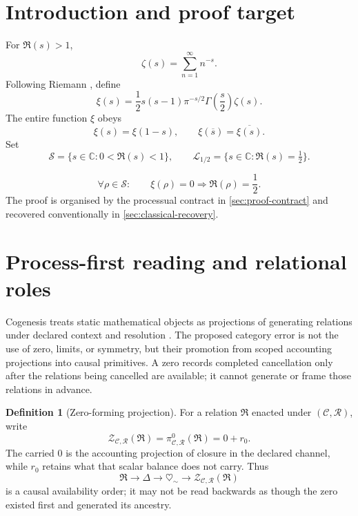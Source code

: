\documentclass[11pt,a4paper]{article}
\theoremstyle{definition}
\newtheorem{definition}[theorem]{Definition}
\newcommand{\C}{\mathbb{C}}
\newcommand{\heartsim}{\heartsuit_{\sim}}
\newcommand{\Cctx}{\mathcal{C}}
\newcommand{\Rres}{\mathcal{R}}
\newcommand{\CriticalLine}{\mathcal{L}_{1/2}}
\newcommand{\CriticalStrip}{\mathcal{S}}
\begin{document}
\newpage
\section{Introduction and proof target}
\label{sec:introduction}

For $\Re(s)>1$,
\begin{equation}
\label{eq:zeta-dirichlet-series}
  \zeta(s)=\sum_{n=1}^{\infty}n^{-s}.
\end{equation}
Following Riemann \parencite{riemann1859}, define
\begin{equation}
\label{eq:completed-xi}
  \xi(s)=\frac12s(s-1)\pi^{-s/2}
    \Gamma\!\left(\frac{s}{2}\right)\zeta(s).
\end{equation}
The entire function $\xi$ obeys
\begin{equation}
\label{eq:xi-static-symmetries}
  \xi(s)=\xi(1-s),
  \qquad
  \xi(\overline{s})=\overline{\xi(s)}.
\end{equation}
Set
\[
  \CriticalStrip=\{s\in\C:0<\Re(s)<1\},
  \qquad
  \CriticalLine=\{s\in\C:\Re(s)=\tfrac12\}.
\]

\begin{keybox}[title={\bfseries Riemann theorem}]
\begin{equation}
\label{eq:riemann-target}
  \forall\rho\in\CriticalStrip:
  \qquad
  \xi(\rho)=0\Longrightarrow\Re(\rho)=\frac12.
\end{equation}
The proof is organised by the processual contract in
\cref{sec:proof-contract} and recovered conventionally in
\cref{sec:classical-recovery}.
\end{keybox}

\section{Process-first reading and relational roles}
\label{sec:process-first}

Cogenesis treats static mathematical objects as projections of generating
relations under declared context and resolution
\parencite{petrik2026cogenesis,petrik2026concise}. The proposed category error
is not the use of zero, limits, or symmetry, but their promotion from scoped
accounting projections into causal primitives. A zero records completed
cancellation only after the relations being cancelled are available; it cannot
generate or frame those relations in advance.

\begin{definition}[Zero-forming projection]
For a relation $\mathfrak R$ enacted under $(\Cctx,\Rres)$, write
\[
  \mathcal Z_{\Cctx,\Rres}(\mathfrak R)
  =
  \pi^0_{\Cctx,\Rres}(\mathfrak R)
  =
  0+r_0.
\]
The carried $0$ is the accounting projection of closure in the declared
channel, while $r_0$ retains what that scalar balance does not carry. Thus
\[
  \mathfrak R
  \longrightarrow
  \Delta
  \longrightarrow
  \heartsim
  \longrightarrow
  \mathcal Z_{\Cctx,\Rres}(\mathfrak R)
\]
is a causal availability order; it may not be read backwards as though the
zero existed first and generated its ancestry.
\end{definition}
\end{document}
